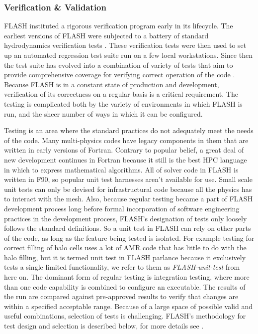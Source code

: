 \subsubsection{Verification \& Validation}
\label{sec:FLASHvandv}

FLASH instituted a rigorous verification program early in its
lifecycle. The earliest versions of FLASH were subjected to
a battery of standard hydrodynamics verification tests
\cite{Fryxell2000}. These verification tests were then used to set up
an automated regression test suite run on a few local
workstations. Since then the test suite has evolved into a
combination of variety of tests that aim to provide comprehensive
coverage for verifying correct operation of the code
\cite{Dubey2013,Calder2005}. Because FLASH is in a constant state of
production and development, verification of its correctness on a
regular basis is a critical requirement.  The testing is complicated
both by the variety of environments in which FLASH is run, and the
sheer number of ways in which it can be configured. 

Testing is an area where the standard practices do not adequately
meet the needs of the code. Many multi-physics codes have legacy
components in them that are written in early versions of
Fortran. Contrary to popular belief, a great deal of new development
continues in Fortran because it still is the best HPC language
in which to express mathematical algorithms. All of solver code in
FLASH is written in F90, so popular unit test harnesses aren't available for
use. Small scale unit tests can only be devised for infrastructural
code because all the physics has to interact with the mesh. Also,
because regular testing became a part of FLASH development process
long before formal incorporation of software engineering practices in
the development process, FLASH's designation of tests only loosely follows the
standard definitions. So a unit test in FLASH can rely on other parts
of the code, as long as the feature being tested is isolated. For
example testing for correct filling of halo cells uses a lot of AMR
code that has little to do with the halo filling, but it is termed
unit test in FLASH parlance because it exclusively tests a single
limited functionality, we refer to them as {\em FLASH-unit-test} from
here on. The dominant form of regular testing is
integration testing, where more than one code capability is combined to
configure an executable. The results of the run are compared against
pre-approved results to verify that changes are within a specified
acceptable range. Because of a large space of possible valid and
useful combinations, selection of tests is challenging. FLASH's
methodology for test design and selection is described below, for more
details see \cite{Dubey2015}.

